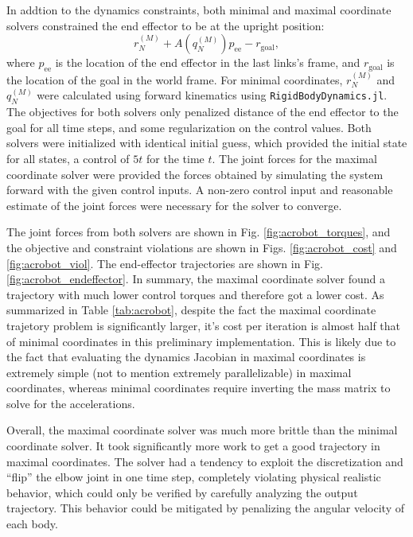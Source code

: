 \documentclass[conference]{IEEEtran}
\begin{document}
In addtion to the dynamics constraints, both minimal and maximal coordinate solvers 
constrained the end effector to be at the upright position:
\begin{equation}
    r_N^{(M)} + A(q_N^{(M)}) p_\text{ee} - r_\text{goal},
\end{equation}
where $p_\text{ee}$ is the location of the end effector in the last links's frame, and
$r_\text{goal}$ is the location of the goal in the world frame.
For minimal coordinates, $r_N^{(M)}$ and $q_N^{(M)}$ were calculated using forward 
kinematics using \texttt{RigidBodyDynamics.jl}. The objectives for both solvers only 
penalized distance of the end effector to the goal for all time steps, and some 
regularization on the control values. Both solvers were initialized with identical 
initial guess, which provided the initial state for all states, a control of $5 t$ for 
the time $t$. The joint forces for the maximal coordinate solver were provided the forces 
obtained by simulating the system forward with the given control inputs. A non-zero control 
input and reasonable estimate of the joint forces were necessary for the solver to converge.

The joint forces from both solvers are shown in Fig. \ref{fig:acrobot_torques}, and the 
objective and constraint violations are shown in Figs. \ref{fig:acrobot_cost} and 
\ref{fig:acrobot_viol}. The end-effector trajectories are shown in Fig. 
\ref{fig:acrobot_endeffector}. In summary, the maximal coordinate solver found a trajectory 
with much lower control torques and therefore got a lower cost. As summarized in Table 
\ref{tab:acrobot}, despite the fact the maximal coordinate trajetory problem is significantly
larger, it's cost per iteration is almost half that of minimal coordinates in this 
preliminary implementation. This is likely due to the fact that evaluating the dynamics Jacobian
in maximal coordinates is extremely simple (not to mention extremely parallelizable) in 
maximal coordinates, whereas minimal coordinates require inverting the mass matrix to solve 
for the accelerations. 

Overall, the maximal coordinate solver was much more brittle than the minimal coordinate 
solver. It took significantly more work to get a good trajectory in maximal coordinates. 
The solver had a tendency to exploit the discretization and ``flip'' the elbow joint in 
one time step, completely violating physical realistic behavior, which could only be 
verified by carefully analyzing the output trajectory. This behavior could be mitigated by 
penalizing the angular velocity of each body.
\end{document}
